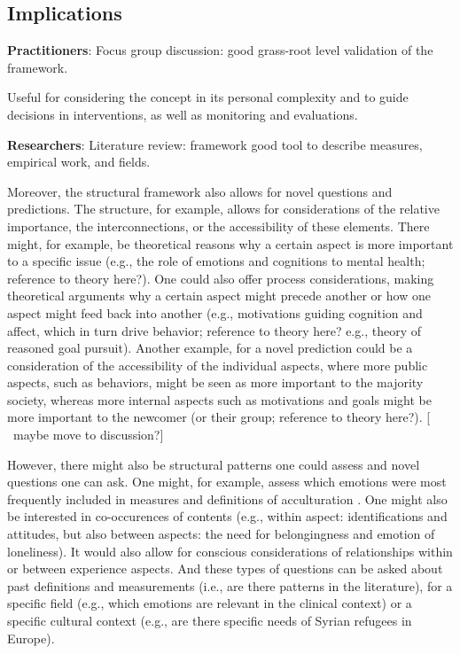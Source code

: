 \documentclass[man, 12pt, a4paper]{apa7}
\newcommand\Warning[1][2ex]{%
  \renewcommand\stacktype{L}%
  \scaleto{\stackon[1.3pt]{\color{red}$\triangle$}{\tiny\bfseries !}}{#1}}%
\begin{document}
\subsection{Implications}
\textbf{Practitioners}: Focus group discussion: good grass-root level validation of the framework.

Useful for considering the concept in its personal complexity and to guide decisions in interventions, as well as monitoring and evaluations. 

\textbf{Researchers}: Literature review: framework good tool to describe measures, empirical work, and fields.

Moreover, the structural framework also allows for novel questions and predictions. The structure, for example, allows for considerations of the relative importance, the interconnections, or the accessibility of these elements. There might, for example, be theoretical reasons why a certain aspect is more important to a specific issue (e.g., the role of emotions and cognitions to mental health; reference to theory here?). One could also offer process considerations, making theoretical arguments why a certain aspect might precede another or how one aspect might feed back into another (e.g., motivations guiding cognition and affect, which in turn drive behavior; reference to theory here? e.g., theory of reasoned goal pursuit). Another example, for a novel prediction could be a consideration of the accessibility of the individual aspects, where more public aspects, such as behaviors, might be seen as more important to the majority society, whereas more internal aspects such as motivations and goals might be more important to the newcomer (or their group; reference to theory here?). [\Warning\ maybe move to discussion?]

However, there might also be structural patterns one could assess and novel questions one can ask. One might, for example, assess which emotions were most frequently included in measures and definitions of acculturation \citep[e.g., specific emotions such as anger or pride, but also types of emotions, such as positive or negative, or about yourself or others;][]{DeLeersnyder2017}. One might also be interested in co-occurences of contents (e.g., within aspect: identifications and attitudes, but also between aspects: the need for belongingness and emotion of loneliness). It would also allow for conscious considerations of relationships within or between experience aspects. And these types of questions can be asked about past definitions and measurements (i.e., are there patterns in the literature), for a specific field (e.g., which emotions are relevant in the clinical context) or a specific cultural context (e.g., are there specific needs of Syrian refugees in Europe). 
\end{document}
